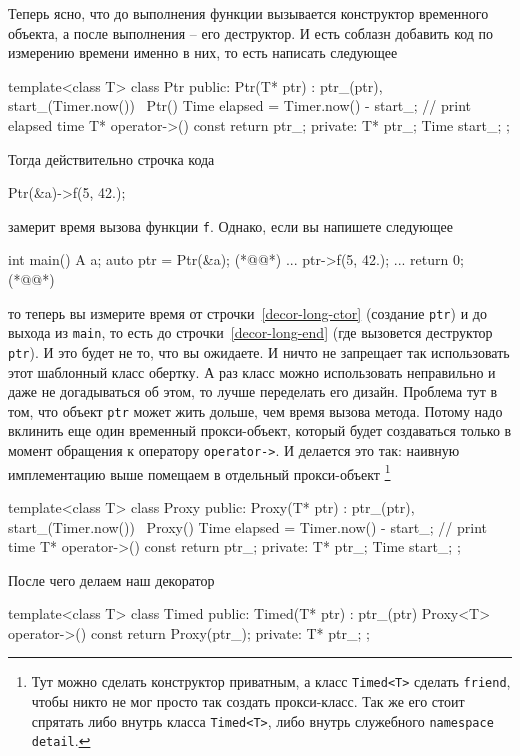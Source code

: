 Теперь ясно, что до выполнения функции вызывается конструктор временного объекта, а после выполнения -- его деструктор.
И есть соблазн добавить код по измерению времени именно в них, то есть написать следующее
\begin{cppcode}
template<class T>
class Ptr {
public:
  Ptr(T* ptr) : ptr_(ptr), start_(Timer.now()) {}
  ~Ptr() {
    Time elapsed = Timer.now() - start_;
    // print elapsed time
  }
  T* operator->() const {
    return ptr_;
  }
private:
  T* ptr_;
  Time start_;
};
\end{cppcode}
Тогда действительно строчка кода
\begin{cppcode}
Ptr(&a)->f(5, 42.);
\end{cppcode}
замерит время вызова функции \verb"f".
Однако, если вы напишете следующее
\begin{cppcode}
int main() {
  A a;
  auto ptr = Ptr(&a); (*@@*)
  ...
  ptr->f(5, 42.);
  ...
  return 0;
} (*@@*)
\end{cppcode}
то теперь вы измерите время от строчки~\ref{decor-long-ctor} (создание \verb"ptr") и до выхода из \verb"main", то есть до строчки~\ref{decor-long-end} (где вызовется деструктор \verb"ptr").
И это будет не то, что вы ожидаете.
И ничто не запрещает так использовать этот шаблонный класс обертку.
А раз класс можно использовать неправильно и даже не догадываться об этом, то лучше переделать его дизайн.
Проблема тут в том, что объект \verb"ptr" может жить дольше, чем время вызова метода.
Потому надо вклинить еще один временный прокси-объект, который будет создаваться только в момент обращения к оператору \verb"operator->".
И делается это так: наивную имплементацию выше помещаем в отдельный прокси-объект%
\footnote{Тут можно сделать конструктор приватным, а класс \verb"Timed<T>" сделать \verb"friend", чтобы никто не мог просто так создать прокси-класс.
Так же его стоит спрятать либо внутрь класса \verb"Timed<T>", либо внутрь служебного \verb"namespace detail".}
\begin{cppcode}
template<class T>
class Proxy {
public:
  Proxy(T* ptr) : ptr_(ptr), start_(Timer.now()) {}
  ~Proxy() {
    Time elapsed = Timer.now() - start_;
    // print time
  }
  T* operator->() const {
    return ptr_;
  }
private:
  T* ptr_;
  Time start_;
};
\end{cppcode}
После чего делаем наш декоратор
\begin{cppcode}
template<class T>
class Timed {
public:
  Timed(T* ptr) : ptr_(ptr) {}
  Proxy<T> operator->() const {
    return Proxy(ptr_);
  }
private:
  T* ptr_;
};
\end{cppcode}
